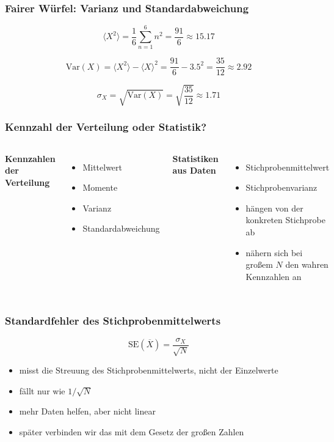 \documentclass[aspectratio=169,professionalfonts]{beamer}
\begin{document}
\begin{frame}[plain]
\end{frame}

\begin{frame}
  \frametitle{Fairer W\"urfel: Varianz und Standardabweichung}

  \[
    \langle X^2\rangle=\frac{1}{6}\sum_{n=1}^{6} n^2=\frac{91}{6}\approx 15.17
  \]

  \[
    \mathrm{Var}(X)=\langle X^2\rangle-\langle X\rangle^2
    =\frac{91}{6}-3.5^2
    =\frac{35}{12}\approx 2.92
  \]

  \[
    \sigma_X=\sqrt{\mathrm{Var}(X)}=\sqrt{\frac{35}{12}}\approx 1.71
  \]
\end{frame}

\begin{frame}
  \frametitle{Kennzahl der Verteilung oder Statistik?}

  \begin{columns}[T,onlytextwidth]
    \textbf{Kennzahlen der Verteilung}
    \begin{itemize}
      \item Mittelwert
      \item Momente
      \item Varianz
      \item Standardabweichung
    \end{itemize}

    \textbf{Statistiken aus Daten}
    \begin{itemize}
      \item Stichprobenmittelwert
      \item Stichprobenvarianz
      \item h\"angen von der konkreten Stichprobe ab
      \item n\"ahern sich bei gro\ss em \(N\) den wahren Kennzahlen an
    \end{itemize}
  \end{columns}
\end{frame}

\begin{frame}
  \frametitle{Standardfehler des Stichprobenmittelwerts}

  \[
    \mathrm{SE}(\overline X)=\frac{\sigma_X}{\sqrt N}
  \]

  \vspace{0.3cm}

  \begin{itemize}
    \item misst die Streuung des Stichprobenmittelwerts, nicht der Einzelwerte
    \item f\"allt nur wie \(1/\sqrt N\)
    \item mehr Daten helfen, aber nicht linear
    \item sp\"ater verbinden wir das mit dem Gesetz der gro\ss en Zahlen
  \end{itemize}
\end{frame}
\end{document}
